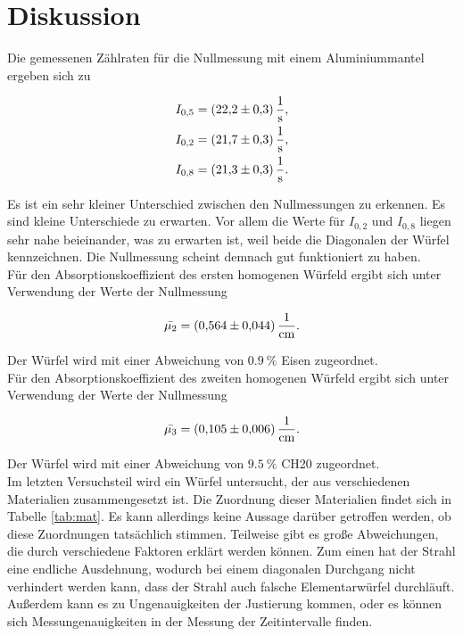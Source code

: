 \section{Diskussion}
\label{sec:Diskussion}

Die gemessenen Zählraten für die Nullmessung mit einem Aluminiummantel ergeben sich zu 

\begin{align*}
    I_{0,5} &= \SI{22.2+-0.3}{\per\second},\\ 
    I_{0,2} &= \SI{21.7+-0.3}{\per\second},\\ 
    I_{0,8} &= \SI{21.3+-0.3}{\per\second}.   
\end{align*}

Es ist ein sehr kleiner Unterschied zwischen den Nullmessungen zu erkennen. Es sind kleine Unterschiede zu erwarten. Vor allem 
die Werte für $I_{0,2}$ und $I_{0,8}$ liegen sehr nahe beieinander, was zu erwarten ist, weil beide die Diagonalen der Würfel kennzeichnen. 
Die Nullmessung scheint demnach gut funktioniert zu haben.\\

Für den Absorptionskoeffizient des ersten homogenen Würfeld ergibt sich unter Verwendung der Werte der Nullmessung 

\begin{equation*}
    \bar{\mu_2} = \SI{0.564+-0.044}{\per\centi\metre}. 
\end{equation*}

Der Würfel wird mit einer Abweichung von $\SI{0.9}{\percent}$ Eisen zugeordnet.\\

Für den Absorptionskoeffizient des zweiten homogenen Würfeld ergibt sich unter Verwendung der Werte der Nullmessung 

\begin{equation*}
    \bar{\mu_3} = \SI{0.105+-0.006}{\per\centi\metre}. 
\end{equation*}

Der Würfel wird mit einer Abweichung von $\SI{9.5}{\percent}$ CH20 zugeordnet.\\

Im letzten Versuchsteil wird ein Würfel untersucht, der aus verschiedenen Materialien zusammengesetzt ist. Die Zuordnung 
dieser Materialien findet sich in Tabelle \ref{tab:mat}. Es kann allerdings keine Aussage darüber getroffen werden, ob diese
Zuordnungen tatsächlich stimmen. Teilweise gibt es große Abweichungen, die durch verschiedene Faktoren erklärt werden können. 
Zum einen hat der Strahl eine endliche Ausdehnung, wodurch bei einem diagonalen Durchgang nicht verhindert werden kann, dass 
der Strahl auch falsche Elementarwürfel durchläuft. Außerdem kann es zu Ungenauigkeiten der Justierung kommen, oder es können
sich Messungenauigkeiten in der Messung der Zeitintervalle finden. 

